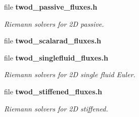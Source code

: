\begin{DoxyCompactItemize}
file {\bf twod\-\_\-passive\-\_\-fluxes.\-h}
\begin{DoxyCompactList}\small\item\em Riemann solvers for 2\-D passive. \end{DoxyCompactList}\item 
file {\bfseries twod\-\_\-scalarad\-\_\-fluxes.\-h}
\item 
file {\bf twod\-\_\-singlefluid\-\_\-fluxes.\-h}
\begin{DoxyCompactList}\small\item\em Riemann solvers for 2\-D single fluid Euler. \end{DoxyCompactList}\item 
file {\bf twod\-\_\-stiffened\-\_\-fluxes.\-h}
\begin{DoxyCompactList}\small\item\em Riemann solvers for 2\-D stiffened. \end{DoxyCompactList}\end{DoxyCompactItemize}
